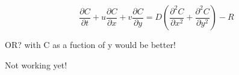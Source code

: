 \documentclass{tufte-handout}\usepackage[]{graphicx}\usepackage[]{xcolor}
\begin{document}
\begin{equation}
\frac{\partial C}{\partial t} + u \frac{\partial C}{\partial x} + v \frac{\partial C}{\partial y} = D \left( \frac{\partial^2 C}{\partial x^2} + \frac{\partial^2 C}{\partial y^2} \right) - R
\end{equation}

OR? with C as a fuction of y would be better!

Not working yet!
\end{document}
